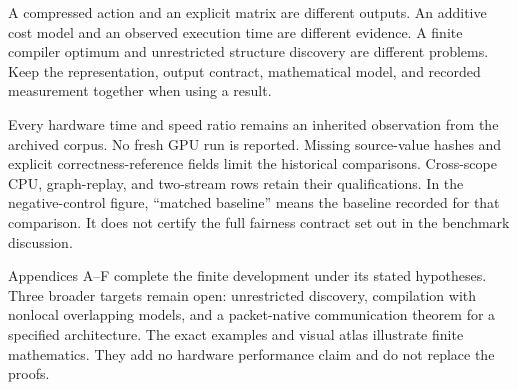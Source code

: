 \documentclass[11pt,letterpaper]{article}
\theoremstyle{definition}
\theoremstyle{remark}
\begin{document}
\begin{keyidea}[title={Representation, output, model, observation}]
A compressed action and an explicit matrix are different outputs. An additive cost model and an observed execution time are different evidence. A finite compiler optimum and unrestricted structure discovery are different problems. Keep the representation, output contract, mathematical model, and recorded measurement together when using a result.
\end{keyidea}

Every hardware time and speed ratio remains an inherited observation from the archived corpus. No fresh GPU run is reported. Missing source-value hashes and explicit correctness-reference fields limit the historical comparisons. Cross-scope CPU, graph-replay, and two-stream rows retain their qualifications. In the negative-control figure, ``matched baseline'' means the baseline recorded for that comparison. It does not certify the full fairness contract set out in the benchmark discussion.

Appendices A--F complete the finite development under its stated hypotheses. Three broader targets remain open: unrestricted discovery, compilation with nonlocal overlapping models, and a packet-native communication theorem for a specified architecture. The exact examples and visual atlas illustrate finite mathematics. They add no hardware performance claim and do not replace the proofs.
\clearpage
\tableofcontents
\clearpage
\listoffigures
\clearpage
{}
\end{document}
